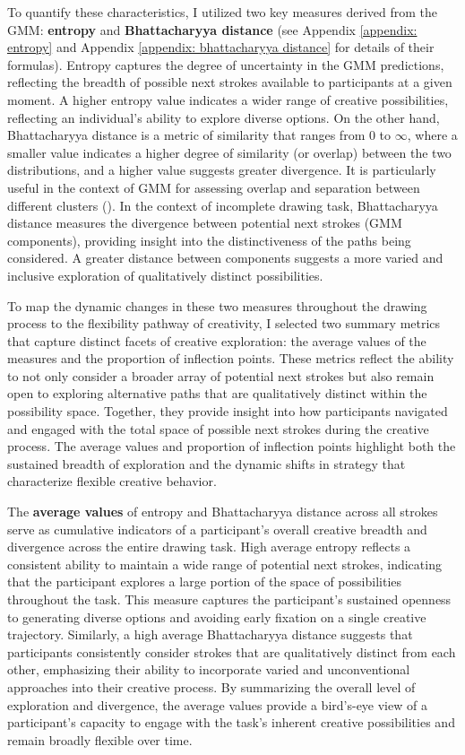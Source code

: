 \documentclass[../MA_Thesis.tex]{subfiles}
\begin{document}
To quantify these characteristics, I utilized two key measures derived from the GMM: \textbf{entropy} and \textbf{Bhattacharyya distance} (see Appendix \ref{appendix: entropy} and Appendix \ref{appendix: bhattacharyya distance} for details of their formulas). Entropy captures the degree of uncertainty in the GMM predictions, reflecting the breadth of possible next strokes available to participants at a given moment. A higher entropy value indicates a wider range of creative possibilities, reflecting an individual's ability to explore diverse options. On the other hand, Bhattacharyya distance is a metric of similarity that ranges from 0 to $\infty$, where a smaller value indicates a higher degree of similarity (or overlap) between the two distributions, and a higher value suggests greater divergence. It is particularly useful in the context of GMM for assessing overlap and separation between different clusters (\cite{alangari_intrinsically_2023}). In the context of incomplete drawing task, Bhattacharyya distance measures the divergence between potential next strokes (GMM components), providing insight into the distinctiveness of the paths being considered. A greater distance between components suggests a more varied and inclusive exploration of qualitatively distinct possibilities.

To map the dynamic changes in these two measures throughout the drawing process to the flexibility pathway of creativity, I selected two summary metrics that capture distinct facets of creative exploration: the average values of the measures and the proportion of inflection points. These metrics reflect the ability to not only consider a broader array of potential next strokes but also remain open to exploring alternative paths that are qualitatively distinct within the possibility space. Together, they provide insight into how participants navigated and engaged with the total space of possible next strokes during the creative process. The average values and proportion of inflection points highlight both the sustained breadth of exploration and the dynamic shifts in strategy that characterize flexible creative behavior. 

The \textbf{average values} of entropy and Bhattacharyya distance across all strokes serve as cumulative indicators of a participant’s overall creative breadth and divergence across the entire drawing task. High average entropy reflects a consistent ability to maintain a wide range of potential next strokes, indicating that the participant explores a large portion of the space of possibilities throughout the task. This measure captures the participant’s sustained openness to generating diverse options and avoiding early fixation on a single creative trajectory. Similarly, a high average Bhattacharyya distance suggests that participants consistently consider strokes that are qualitatively distinct from each other, emphasizing their ability to incorporate varied and unconventional approaches into their creative process. By summarizing the overall level of exploration and divergence, the average values provide a bird’s-eye view of a participant’s capacity to engage with the task’s inherent creative possibilities and remain broadly flexible over time.
\end{document}

